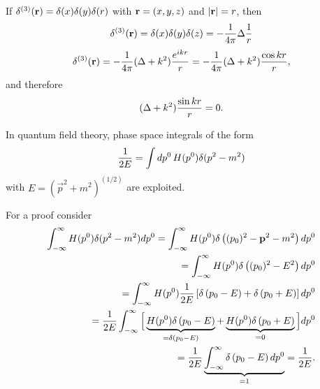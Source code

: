 If $ \delta^{(3)} ({\bf r})=
\delta (x)
\delta (y)
\delta (r)$ with ${\bf r}=(x,y,z)$ and $\vert {\bf r}\vert=r$, then
 \begin{equation}
 \delta^{(3)} ({\bf r})=\delta (x)\delta (y)\delta (z)=-{1\over 4\pi }\Delta {1\over  r }
 \end{equation}
 \begin{equation}
 \delta^{(3)}  ({\bf r})=-{1\over 4\pi }(\Delta +k^2){e^{ikr}\over r} = -{1\over 4\pi }(\Delta +k^2){\cos kr\over r},
 \end{equation}
and therefore
\begin{equation}
 (\Delta +k^2){\sin kr\over r} = 0.
 \end{equation}

In quantum field theory,  phase space integrals of the form
 \begin{equation}
 {1\over 2E}=\int dp^0 \, H (p^0)\delta (p^2-m^2)
 \end{equation}
 with $E=({\vec p}^2+m^2)^{(1/2)}$
 are exploited.

{\color{OliveGreen}
\bproof
For a proof consider
 \begin{equation}
 \begin{split}
\int_{-\infty}^\infty     H (p^0)\delta (p^2-m^2)  dp^0
=
\int_{-\infty}^\infty    H (p^0)\delta \left((p_0)^2-{\bf p}^2-m^2\right) dp^0\\
=
\int_{-\infty}^\infty   H (p^0)\delta \left((p_0)^2-E^2\right)  dp^0  \\
=
\int_{-\infty}^\infty   H (p^0)\frac{1}{2E} \left[\delta \left( p_0 - E \right) + \delta \left( p_0 + E \right) \right]  dp^0 \\
=
\frac{1}{2E} \int_{-\infty}^\infty   \Big[\underbrace{H (p^0) \delta \left( p_0 - E \right)}_{=\delta \left( p_0 - E \right)}
 +
\underbrace{H (p^0) \delta \left( p_0 + E \right)}_{=0}
\Big] dp^0\\
=  \frac{1}{2E} \underbrace{\int_{-\infty}^\infty   \delta \left( p_0 - E \right)  dp^0}_{=1} =\frac{1}{2E}
.
\end{split}
 \end{equation}
\eproof
}


